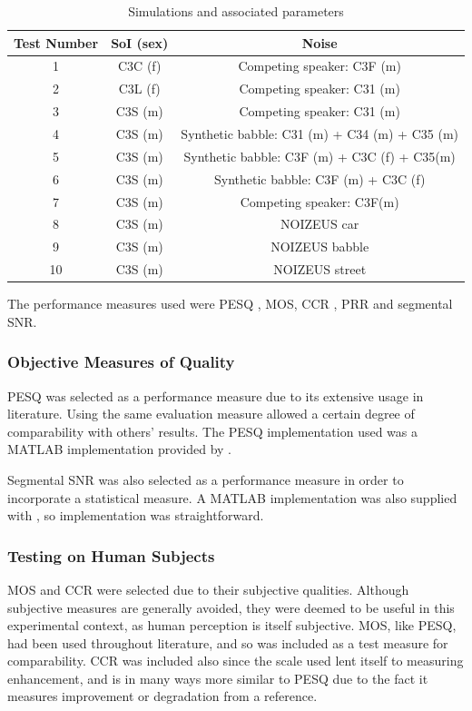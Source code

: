 \begin{table}
\protect\caption{\label{tab:test-params}Simulations and associated parameters}


\centering{}%
\begin{tabular}{|c|c|c|}
\hline 
Test Number & \ac{SoI} (sex) & Noise\tabularnewline
\hline 
\hline 
1 & C3C (f) & Competing speaker: C3F (m)\tabularnewline
\hline 
2 & C3L (f) & Competing speaker: C31 (m)\tabularnewline
\hline 
3 & C3S (m) & Competing speaker: C31 (m)\tabularnewline
\hline 
4 & C3S (m) & Synthetic babble: C31 (m) + C34 (m) + C35 (m)\tabularnewline
\hline 
5 & C3S (m) & Synthetic babble: C3F (m) + C3C (f) + C35(m)\tabularnewline
\hline 
6 & C3S (m) & Synthetic babble: C3F (m) + C3C (f)\tabularnewline
\hline 
7 & C3S (m) & Competing speaker: C3F(m)\tabularnewline
\hline 
8 & C3S (m) & NOIZEUS car\tabularnewline
\hline 
9 & C3S (m) & NOIZEUS babble\tabularnewline
\hline 
10 & C3S (m) & NOIZEUS street\tabularnewline
\hline 
\end{tabular}
\end{table}


The performance measures used were \ac{PESQ} \citep{InternationalTelecommunicationUnion2001},
\ac{MOS}, \ac{CCR} \citep{InternationalTelecommunicationUnion1996},
\ac{PRR} and segmental \ac{SNR}.


\subsubsection*{Objective Measures of Quality}

\ac{PESQ} was selected as a performance measure due to its extensive
usage in literature. Using the same evaluation measure allowed a certain
degree of comparability with others' results. The \ac{PESQ} implementation
used was a MATLAB implementation provided by \citet{Loizou2008}.

Segmental \ac{SNR} was also selected as a performance measure in
order to incorporate a statistical measure. A MATLAB implementation
was also supplied with \citep{Loizou2008}, so implementation was
straightforward.


\subsubsection*{Testing on Human Subjects}

\ac{MOS} and \ac{CCR} were selected due to their subjective qualities.
Although subjective measures are generally avoided, they were deemed
to be useful in this experimental context, as human perception is
itself subjective. \ac{MOS}, like \ac{PESQ}, had been used throughout
literature, and so was included as a test measure for comparability.
\ac{CCR} was included also since the scale used lent itself to measuring
enhancement, and is in many ways more similar to \ac{PESQ} due to
the fact it measures improvement or degradation from a reference.

